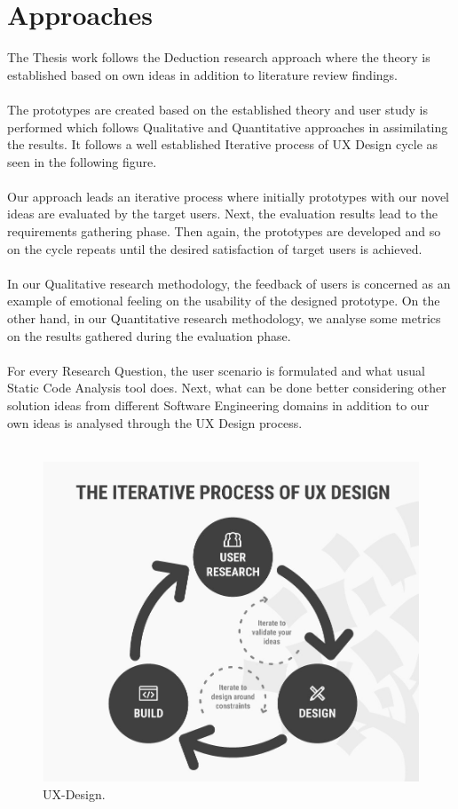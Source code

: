 \chapter{Approaches}
\label{ch:approaches}

The Thesis work follows the Deduction research approach where the theory is established based on own ideas in addition to literature review findings. \\ \\

The prototypes are created based on the established theory and user study is performed which follows Qualitative and Quantitative approaches in assimilating the results. It follows a well established Iterative process of UX Design cycle as seen in the following figure. \\ \\

Our approach leads an iterative process where initially prototypes with our novel ideas are evaluated by the target users. Next, the evaluation results lead to the requirements gathering phase. Then again, the prototypes are developed and so on the cycle repeats until the desired satisfaction of target users is achieved. \\ \\

In our Qualitative research methodology, the feedback of users is concerned as an example of emotional feeling on the usability of the designed prototype. On the other hand, in our Quantitative research methodology, we analyse some metrics on the results gathered during the evaluation phase. \\ \\

For every Research Question, the user scenario is formulated and what usual Static Code Analysis tool does. Next,  what can be done better considering other solution ideas from different Software Engineering domains in addition to our own ideas is analysed through the UX Design process. \\ \\

\begin{figure}[hbt!]
	\centering
	\includegraphics[width=\linewidth]{figures/ux-design}
	\caption{UX-Design.}
	\label{fig:ux-design}
\end{figure}